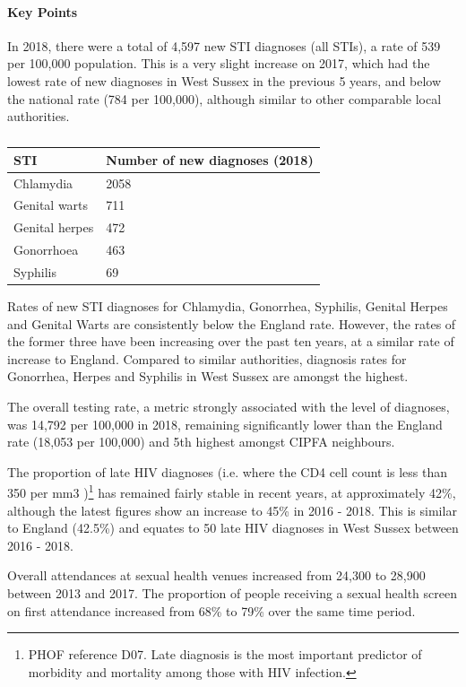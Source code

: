 \paragraph{Key Points} In 2018, there were a total of 4,597 new STI diagnoses (all STIs), a rate of 539 per 100,000 population. This is a very slight increase on 2017, which had the lowest rate of new diagnoses in West Sussex in the previous 5 years, and below the national rate (784 per 100,000), although similar to other comparable local authorities.

\begin{table}
    \caption{}
    \centering
    \begin{tabular}{ll}
    \toprule
    STI & Number of new diagnoses (2018) \\
    \midrule
    Chlamydia & 2058 \\
    Genital warts & 711 \\
    Genital herpes & 472 \\
    Gonorrhoea & 463 \\
    Syphilis & 69 \\
    \bottomrule
    \end{tabular}
    \label{tab:wa:stis}
\end{table}

Rates of new STI diagnoses for Chlamydia, Gonorrhea, Syphilis, Genital Herpes and Genital Warts are consistently below the England rate. However, the rates of the former three have been increasing over the past ten years, at a similar rate of increase to England. Compared to similar authorities, diagnosis rates for Gonorrhea, Herpes and Syphilis in West Sussex are amongst the highest.

The overall testing rate, a metric strongly associated with the level of diagnoses, was 14,792 per 100,000 in 2018, remaining significantly lower than the England rate (18,053 per 100,000) and 5th highest amongst CIPFA neighbours.

The proportion of late HIV diagnoses (i.e. where the CD4 cell count is less than 350 per mm3 )\footnote{PHOF reference D07. Late diagnosis is the most important predictor of morbidity and mortality among those with HIV infection.} has remained fairly stable in recent years, at approximately 42\%, although the latest figures show an increase to 45\% in 2016 - 2018. This is similar to England (42.5\%) and equates to 50 late HIV diagnoses in West Sussex between 2016 - 2018.

Overall attendances at sexual health venues increased from 24,300 to 28,900 between 2013 and 2017. The proportion of people receiving a sexual health screen on first attendance increased from 68\% to 79\% over the same time period.

